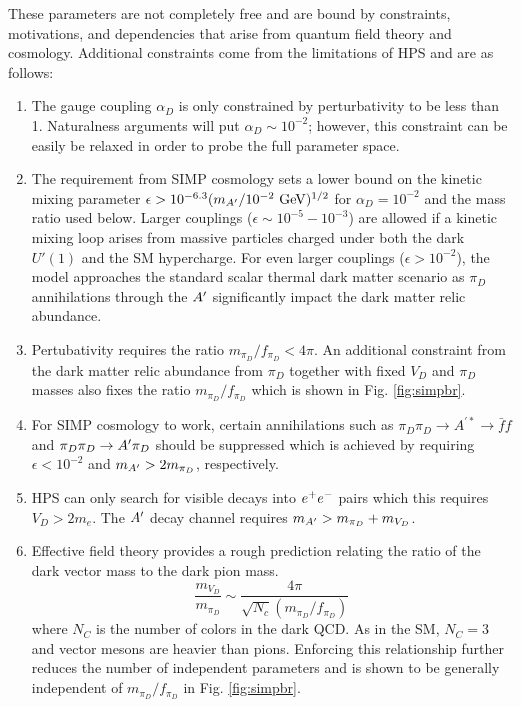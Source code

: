 These parameters are not completely free and are bound by constraints, motivations, and dependencies that arise from quantum field theory and cosmology. Additional constraints come from the limitations of HPS and are as follows:

\begin{enumerate}
  \item The gauge coupling $\alpha_D$ is only constrained by perturbativity to be less than 1. Naturalness arguments will put $\alpha_D \sim 10^{-2}$; however, this constraint can be easily be relaxed in order to probe the full parameter space.
  \item The requirement from SIMP cosmology sets a lower bound on the kinetic mixing parameter $\epsilon > 10^{-6.3}(m_{A^\prime}/10^{-2} \ \mathrm{GeV})^{1/2}$ for $\alpha_D = 10^{-2}$ and the mass ratio used below.  Larger couplings ($\epsilon \sim 10^{-5}-10^{-3}$) are allowed if a kinetic mixing loop arises from massive particles charged under both the dark $U \prime (1)$ and the SM hypercharge. For even larger couplings ($\epsilon > 10^{-2}$), the model approaches the standard scalar thermal dark matter scenario as $\pi_D$ annihilations through the $A^\prime$ significantly impact the dark matter relic abundance.
  \item Pertubativity requires the ratio $m_{\pi_D}/f_{\pi_D} < 4 \pi$. An additional constraint from the dark matter relic abundance from $\pi_D$ together with fixed $V_D$ and $\pi_D$ masses also fixes the ratio $m_{\pi_D}/f_{\pi_D}$ which is shown in Fig. \ref{fig:simpbr}.
  \item For SIMP cosmology to work, certain annihilations such as $\pi_D \pi_D \rightarrow A^{\prime*} \rightarrow \bar{f}f$ and $\pi_D \pi_D \rightarrow A^\prime \pi_D$ should be suppressed which is achieved by requiring $\epsilon < 10^{-2}$ and $m_{A^\prime}>2m_{\pi_D}$, respectively.
  \item HPS can only search for visible decays into $e^{+}e^{-}$ pairs which this requires $V_D > 2m_e$. The $A^\prime$ decay channel requires $m_{A^\prime}>m_{\pi_D} + m_{V_D}$.
  \item Effective field theory provides a rough prediction relating the ratio of the dark vector mass to the dark pion mass.
  \begin{equation}
    \frac{m_{V_D}}{m_{\pi_D}} \sim \frac{4 \pi}{\sqrt{N_c}(m_{\pi_D}/f_{\pi_D})}
    \label{eqn:mvdmpid}
  \end{equation}
  where $N_C$ is the number of colors in the dark QCD. As in the SM, $N_C=3$ and vector mesons are heavier than pions. Enforcing this relationship further reduces the number of independent parameters and is shown to be generally independent of $m_{\pi_D}/f_{\pi_D}$ in Fig. \ref{fig:simpbr}.
\end{enumerate}


